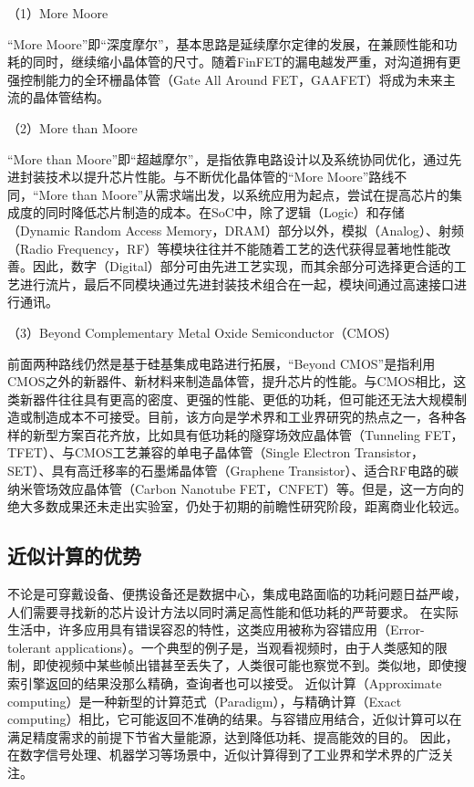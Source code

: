 
（1）More Moore

“More Moore”即“深度摩尔”，基本思路是延续摩尔定律的发展，在兼顾性能和功耗的同时，继续缩小晶体管的尺寸\cite{more_moore}。随着FinFET的漏电越发严重，对沟道拥有更强控制能力的全环栅晶体管（Gate All Around FET，GAAFET）将成为未来主流的晶体管结构\cite{GAA}。

（2）More than Moore

“More than Moore”即“超越摩尔”，是指依靠电路设计以及系统协同优化，通过先进封装技术以提升芯片性能\cite{more_than_moore}。与不断优化晶体管的“More Moore”路线不同，“More than Moore”从需求端出发，以系统应用为起点，尝试在提高芯片的集成度的同时降低芯片制造的成本。在SoC中，除了逻辑（Logic）和存储（Dynamic Random Access Memory，DRAM）部分以外，模拟（Analog）、射频（Radio Frequency，RF）等模块往往并不能随着工艺的迭代获得显著地性能改善。因此，数字（Digital）部分可由先进工艺实现，而其余部分可选择更合适的工艺进行流片，最后不同模块通过先进封装技术组合在一起，模块间通过高速接口进行通讯。


（3）Beyond Complementary Metal Oxide Semiconductor（CMOS）

前面两种路线仍然是基于硅基集成电路进行拓展，“Beyond CMOS”是指利用CMOS之外的新器件、新材料来制造晶体管，提升芯片的性能\cite{beyond_cmos}。与CMOS相比，这类新器件往往具有更高的密度、更强的性能、更低的功耗，但可能还无法大规模制造或制造成本不可接受。目前，该方向是学术界和工业界研究的热点之一，各种各样的新型方案百花齐放，比如具有低功耗的隧穿场效应晶体管（Tunneling FET，TFET）\cite{TFET}、与CMOS工艺兼容的单电子晶体管（Single Electron Transistor，SET）\cite{SET}、具有高迁移率的石墨烯晶体管（Graphene Transistor）\cite{Graphene_transistor}、适合RF电路的碳纳米管场效应晶体管（Carbon Nanotube FET，CNFET）\cite{Carbon_Nanotube_FET}等。但是，这一方向的绝大多数成果还未走出实验室，仍处于初期的前瞻性研究阶段，距离商业化较远。

\subsection{近似计算的优势} \label{approximate_computing_advance}

不论是可穿戴设备、便携设备还是数据中心，集成电路面临的功耗问题日益严峻，人们需要寻找新的芯片设计方法以同时满足高性能和低功耗的严苛要求。
在实际生活中，许多应用具有错误容忍的特性，这类应用被称为容错应用（Error-tolerant applications）。一个典型的例子是，当观看视频时，由于人类感知的限制，即使视频中某些帧出错甚至丢失了，人类很可能也察觉不到。类似地，即使搜索引擎返回的结果没那么精确，查询者也可以接受。
近似计算（Approximate computing）是一种新型的计算范式（Paradigm），与精确计算（Exact computing）相比，它可能返回不准确的结果。与容错应用结合，近似计算可以在满足精度需求的前提下节省大量能源，达到降低功耗、提高能效的目的。
因此，在数字信号处理、机器学习等场景中，近似计算得到了工业界和学术界的广泛关注\cite{AC:survey:survey's_survey,AC:survey:hanjie_2013_ETS}。

